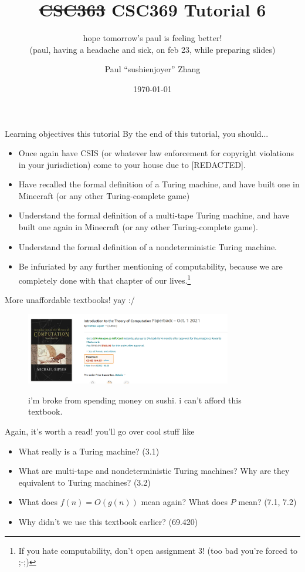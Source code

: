 \documentclass{beamer}
\title{\sout{CSC363} CSC369 Tutorial 6}
\subtitle{hope tomorrow's paul is feeling better!\\ (paul, having a headache and sick, on feb 23, while preparing slides)}
\date{\today}
\author{Paul ``sushi{\textunderscore}enjoyer'' Zhang}
\institute{University of Amogus}
\begin{document}
\maketitle

\begin{frame}{Learning objectives this tutorial}
By the end of this tutorial, you should...
\begin{itemize}
\item Once again have CSIS (or whatever law enforcement for copyright violations in your jurisdiction) come to your house due to [REDACTED].
\item Have recalled the formal definition of a Turing machine, and have built one in Minecraft (or any other Turing-complete game)
\item Understand the formal definition of a multi-tape Turing machine, and have built one again in Minecraft (or any other Turing-complete game).
\item Understand the formal definition of a nondeterministic Turing machine.
\item Be infuriated by any further mentioning of computability, because we are completely done with that chapter of our lives.\footnote{If you hate computability, don't open assignment 3! (too bad you're forced to ;-;)}
\end{itemize}
\end{frame}

\begin{frame}{More unaffordable textbooks! yay :/}
\begin{figure}[h]
\centering
\includegraphics[width=9cm]{img/amazon.png}

i'm broke from spending money on sushi. i can't afford this textbook.
\end{figure}
Again, it's worth a read! you'll go over cool stuff like
\begin{itemize}
\item What really is a Turing machine? (3.1)
\item What are multi-tape and nondeterministic Turing machines? Why are they equivalent to Turing machines? (3.2)
\item What does $f(n) = O(g(n))$ mean again? What does $P$ mean? (7.1, 7.2)
\item Why didn't we use this textbook earlier? (69.420)
\end{itemize}
\end{frame}
\end{document}
